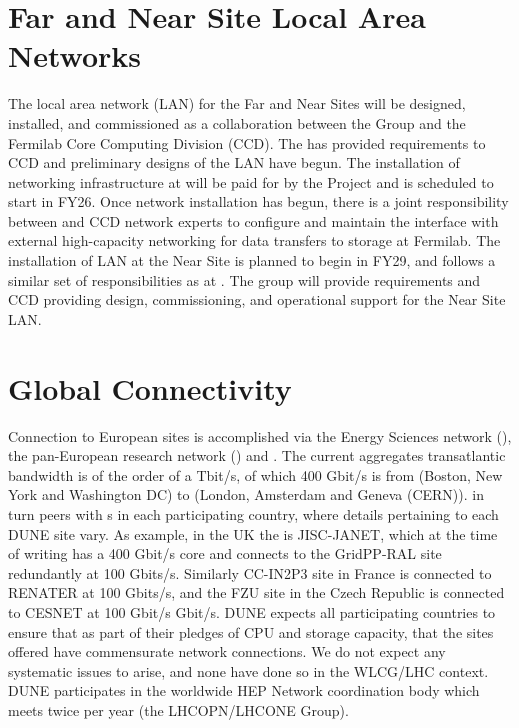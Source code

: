 \documentclass[../main-v1.tex]{subfiles}
\begin{document}
\section{Far and Near Site Local Area Networks}

The local area network (LAN) for the Far and Near Sites will be designed, installed, and commissioned as a collaboration between the   Group and the Fermilab Core Computing Division (CCD). The  has provided requirements to CCD and preliminary designs of the LAN have begun. The installation of networking infrastructure at  will be paid for by the  Project and is scheduled to start in FY26. Once network installation has begun, there is a joint responsibility between  and CCD network experts to configure and maintain the interface with external high-capacity networking for data transfers to storage at Fermilab. The installation of LAN at the Near Site is planned to begin in FY29, and follows a similar set of responsibilities as at . The  group will provide requirements and CCD providing design, commissioning, and operational support for the Near Site LAN.

\section{Global Connectivity}
Connection to European sites is accomplished via the Energy Sciences network (),
the pan-European research network () and .
The current aggregates transatlantic bandwidth is of the order of a Tbit/s, of which 400 Gbit/s is from   (Boston, New York and Washington DC)
to  (London, Amsterdam and Geneva (CERN)).
 in turn peers with s  in each participating country, where details
pertaining to each DUNE site vary. As example, in the UK the
 is JISC-JANET, which at the time of writing has a 400
Gbit/s core and connects to the GridPP-RAL site redundantly at 100 Gbits/s.
Similarly CC-IN2P3 site in France is connected to RENATER at 100
Gbits/s, and the FZU site in the Czech Republic is connected to CESNET
at 100 Gbit/s Gbit/s.  DUNE expects all participating countries to
ensure that as part of their pledges of CPU and storage capacity, that
the sites offered have commensurate network connections. We do not
expect any systematic issues to arise, and none have done so in the
WLCG/LHC context. DUNE participates in the worldwide HEP Network
coordination body which meets twice per year  (the LHCOPN/LHCONE Group).
\end{document}
